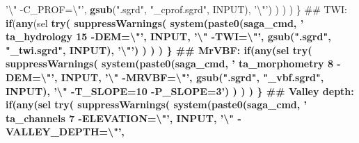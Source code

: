 \documentclass[graybox,natbib,nospthms,UStrade]{svmono}
\newenvironment{Shaded}{\begin{snugshade}}{\end{snugshade}}
\newcommand{\CharTok}[1]{\textcolor[rgb]{0.5,0.5,0.5}{#1}}
\newcommand{\ControlFlowTok}[1]{\textcolor[rgb]{0.27,0.27,0.27}{\textbf{#1}}}
\newcommand{\KeywordTok}[1]{\textcolor[rgb]{0.27,0.27,0.27}{\textbf{#1}}}
\newcommand{\NormalTok}[1]{#1}
\newcommand{\OperatorTok}[1]{\textcolor[rgb]{0.43,0.43,0.43}{\textbf{#1}}}
\newcommand{\StringTok}[1]{\textcolor[rgb]{0.5,0.5,0.5}{#1}}
\begin{document}
\begin{Shaded}
\begin{Highlighting}[]
{                                         \StringTok{'}\CharTok{\textbackslash{}"}\StringTok{ -C_PROF=}\CharTok{\textbackslash{}"}\StringTok{'}\NormalTok{, }
                                         \KeywordTok{gsub}\NormalTok{(}\StringTok{".sgrd"}\NormalTok{, }\StringTok{"_cprof.sgrd"}\NormalTok{, INPUT), }\StringTok{'}\CharTok{\textbackslash{}"}\StringTok{'}\NormalTok{) ) ) )}
\NormalTok{  \}}
\NormalTok{  ## TWI:}
  \ControlFlowTok{if}\NormalTok{(}\KeywordTok{any}\NormalTok{(sel }\OperatorTok{%
    \KeywordTok{try}\NormalTok{( }\KeywordTok{suppressWarnings}\NormalTok{( }\KeywordTok{system}\NormalTok{(}\KeywordTok{paste0}\NormalTok{(saga_cmd, }
                                         \StringTok{' ta_hydrology 15 -DEM=}\CharTok{\textbackslash{}"}\StringTok{'}\NormalTok{, }
\NormalTok{                                         INPUT, }\StringTok{'}\CharTok{\textbackslash{}"}\StringTok{ -TWI=}\CharTok{\textbackslash{}"}\StringTok{'}\NormalTok{, }
                                         \KeywordTok{gsub}\NormalTok{(}\StringTok{".sgrd"}\NormalTok{, }\StringTok{"_twi.sgrd"}\NormalTok{, INPUT), }\StringTok{'}\CharTok{\textbackslash{}"}\StringTok{'}\NormalTok{) ) ) )}
\NormalTok{  \}}
\NormalTok{  ## MrVBF:}
  \ControlFlowTok{if}\NormalTok{(}\KeywordTok{any}\NormalTok{(sel }\OperatorTok{%
    \KeywordTok{try}\NormalTok{( }\KeywordTok{suppressWarnings}\NormalTok{( }\KeywordTok{system}\NormalTok{(}\KeywordTok{paste0}\NormalTok{(saga_cmd, }
                                         \StringTok{' ta_morphometry 8 -DEM=}\CharTok{\textbackslash{}"}\StringTok{'}\NormalTok{, }
\NormalTok{                                         INPUT, }\StringTok{'}\CharTok{\textbackslash{}"}\StringTok{ -MRVBF=}\CharTok{\textbackslash{}"}\StringTok{'}\NormalTok{,}
                                         \KeywordTok{gsub}\NormalTok{(}\StringTok{".sgrd"}\NormalTok{, }\StringTok{"_vbf.sgrd"}\NormalTok{, INPUT),}
                                         \StringTok{'}\CharTok{\textbackslash{}"}\StringTok{ -T_SLOPE=10 -P_SLOPE=3'}\NormalTok{) ) ) )}
\NormalTok{  \}}
\NormalTok{  ## Valley depth:}
  \ControlFlowTok{if}\NormalTok{(}\KeywordTok{any}\NormalTok{(sel }\OperatorTok{%
    \KeywordTok{try}\NormalTok{( }\KeywordTok{suppressWarnings}\NormalTok{( }\KeywordTok{system}\NormalTok{(}\KeywordTok{paste0}\NormalTok{(saga_cmd, }
                                         \StringTok{' ta_channels 7 -ELEVATION=}\CharTok{\textbackslash{}"}\StringTok{'}\NormalTok{, }
\NormalTok{                                         INPUT, }\StringTok{'}\CharTok{\textbackslash{}"}\StringTok{ -VALLEY_DEPTH=}\CharTok{\textbackslash{}"}\StringTok{'}\NormalTok{, }
}}}}
\end{Highlighting}
\end{Shaded}
\end{document}
